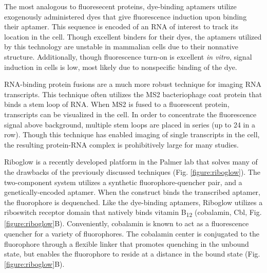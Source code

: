 The most analogous to fluoresecent proteins, dye-binding aptamers utilize exogenously administered dyes that give fluorescence induction upon binding their aptamer.\cite{PaigeRNAMimicsGreen2011,FilonovBroccoliRapidSelection2014,AutourFluorogenicRNAMango2018,DolgosheinaRNAMangoAptamerFluorophore2014} This sequence is encoded  of an RNA of interest to track its location in the cell. Though excellent binders for their dyes, the aptamers utilized by this technology are unstable in mammalian cells due to their nonnative structure.\cite{EtzelSyntheticRiboswitchesPlug2017} Additionally, though fluorescence turn-on is excellent \textit{in vitro}, signal induction in cells is low, most likely due to nonspecific binding of the dye.

RNA-binding protein fusions are a much more robust technique for imaging RNA transcripts.\cite{FuscoSinglemRNAMolecules2003} This technique often utilizes the MS2 bacteriophage coat protein that binds a stem loop of RNA. When MS2 is fused to a fluorescent protein, transcripts can be visualized in the cell. In order to concentrate the fluorescence signal above background, multiple stem loops are placed in series (up to 24 in a row). Though this technique has enabled imaging of single transcripts in the cell,\cite{MorisakiRealtimequantificationsingle2016,FuscoSinglemRNAMolecules2003} the resulting protein-RNA complex is prohibitively large for many studies.


Riboglow is a recently developed platform in the Palmer lab that solves many of the drawbacks of the previously discussed techniques (Fig. \ref{figure:riboglow}). The two-component system utilizes a synthetic fluorophore-quencher pair, and a genetically-encoded aptamer. When the construct binds the transcribed aptamer, the fluorophore is dequenched. Like the dye-binding aptamers, Riboglow utilizes a riboswitch receptor domain that natively binds vitamin B\textsubscript{12} (cobalamin, Cbl, Fig. \ref{figure:riboglow}B).\cite{JohnsonJrB12cofactorsdirectly2012} Conveniently, cobalamin is known to act as a fluorescence quencher for a variety of fluorophores.\cite{RosendahlSynthesisbiologicalactivity1982,LeeDesignSynthesisCharacterization2009,SmeltzerSynthesisCharacterizationFluorescent2001} The cobalamin center is conjugated to the fluorophore through a flexible linker that promotes quenching in the unbound state, but enables the fluorophore to reside at a distance in the bound state (Fig. \ref{figure:riboglow}B).

